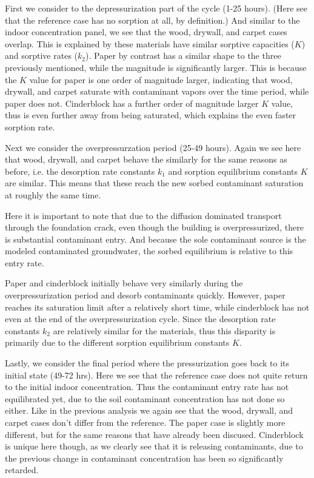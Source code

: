 First we consider to the depressurization part of the cycle (1-25 hours).
(Here see that the reference case has no sorption at all, by definition.)
And similar to the indoor concentration panel, we see that the wood, drywall, and carpet cases overlap.
This is explained by these materials have similar sorptive capacities ($K$) and sorptive rates ($k_2$).
Paper by contrast has a similar shape to the three previously mentioned, while the magnitude is significantly larger.
This is because the $K$ value for paper is one order of magnitude larger, indicating that wood, drywall, and carpet saturate with contaminant vapors over the time period, while paper does not.
Cinderblock has a further order of magnitude larger $K$ value, thus is even further away from being saturated, which explains the even faster sorption rate.\par

Next we consider the overpressurzation period (25-49 hours).
Again we see here that wood, drywall, and carpet behave the similarly for the same reasons as before, i.e. the desorption rate constants $k_1$ and sorption equilibrium constants $K$ are similar.
This means that these reach the new sorbed contaminant saturation at roughly the same time.\par

Here it is important to note that due to the diffusion dominated transport through the foundation crack, even though the building is overpressurized, there is substantial contaminant entry.
And because the sole contaminant source is the modeled contaminated groundwater, the sorbed equilibrium is relative to this entry rate.\par

Paper and cinderblock initially behave very similarly during the overpressurization period and desorb contaminants quickly.
However, paper reaches its saturation limit after a relatively short time, while cinderblock has not even at the end of the overpressurization cycle.
Since the desorption rate constants $k_2$ are relatively similar for the materials, thus this disparity is primarily due to the different sorption equilibrium constants $K$.\par

Lastly, we consider the final period where the pressurization goes back to its initial state (49-72 hrs).
Here we see that the reference case does not quite return to the initial indoor concentration.
Thus the contaminant entry rate has not equilibrated yet, due to the soil contaminant concentration has not done so either.
Like in the previous analysis we again see that the wood, drywall, and carpet cases don't differ from the reference.
The paper case is slightly more different, but for the same reasons that have already been discused.
Cinderblock is unique here though, as we clearly see that it is releasing contaminants, due to the previous change in contaminant concentration has been so significantly retarded.\par


